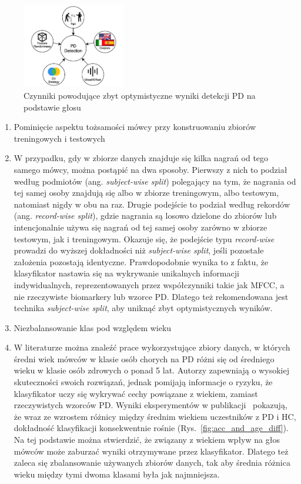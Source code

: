 \begin{figure}[htbp]
	\centering
	\includegraphics[width=0.4\textwidth]{./img/influence_of_factors_on_PD_detection}
	\caption{Czynniki powodujące zbyt optymistyczne wyniki detekcji PD na podstawie głosu \cite {SustainedVowelsProblems}}
    \label{fig:factors_PD_detection}
\end{figure}


\begin{enumerate}[label={\alph*)}]
	\item Pominięcie aspektu tożsamości mówcy przy konstruowaniu zbiorów treningowych i testowych
	\item[] W przypadku, gdy w zbiorze danych znajduje się kilka nagrań od tego samego mówcy, można postąpić na dwa sposoby.
Pierwszy z nich to podział według podmiotów (ang. \emph{subject-wise split}) polegający na tym, że nagrania od tej samej
osoby znajdują się albo w zbiorze treningowym, albo testowym, natomiast nigdy w obu na raz.
Drugie podejście to podział według rekordów (ang. \emph{record-wise split}), gdzie nagrania są losowo dzielone do zbiorów
lub intencjonalnie używa się nagrań od tej samej osoby zarówno w zbiorze testowym, jak i treningowym.
Okazuje się, że podejście typu \emph{record-wise} prowadzi do wyższej dokładności niż \emph{subject-wise split}, jeśli pozostałe założenia pozostają identyczne.
Prawdopodobnie wynika to z faktu, że klasyfikator nastawia się na wykrywanie unikalnych informacji indywidualnych,
reprezentowanych przez współczynniki takie jak MFCC, a nie rzeczywiste biomarkery lub wzorce PD\@.
Dlatego też rekomendowana jest technika \emph{subject-wise split}, aby uniknąć zbyt optymistycznych wyników.

  	\item Niezbalansowanie klas pod względem wieku
	\item[] W literaturze można znaleźć prace wykorzystujące zbiory danych, w których średni wiek mówców
w klasie osób chorych na PD różni się od średniego wieku w klasie osób zdrowych o ponad 5 lat.
Autorzy zapewniają o wysokiej skuteczności swoich rozwiązań, jednak pomijają informacje o ryzyku, że klasyfikator
uczy się wykrywać cechy powiązane z wiekiem, zamiast rzeczywistych wzorców PD\@.
Wyniki eksperymentów w publikacji~\cite{SustainedVowelsProblems} pokazują, że wraz ze wzrostem różnicy między średnim wiekiem uczestników z PD i HC,
dokładność klasyfikacji konsekwentnie rośnie (Rys.~\ref{fig:acc_and_age_diff}).
Na tej podstawie można stwierdzić, że związany z wiekiem wpływ na głos mówców może zaburzać wyniki otrzymywane przez klasyfikator.
Dlatego też zaleca się zbalansowanie używanych zbiorów danych, tak aby średnia różnica wieku między tymi dwoma klasami była jak najmniejsza.



\end{enumerate}
